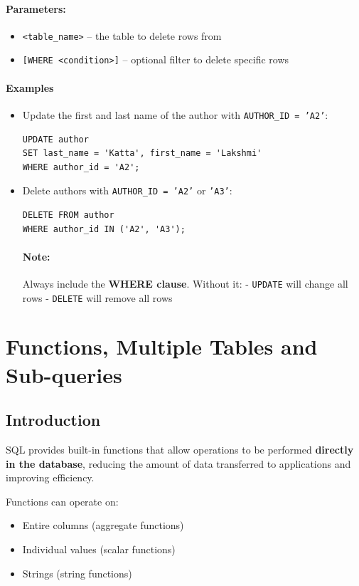 \documentclass{article}
\begin{document}
\paragraph{Parameters:}
\begin{itemize}
    \item \texttt{<table\_name>} – the table to delete rows from  
    \item \texttt{[WHERE <condition>]} – optional filter to delete specific rows
\end{itemize}


\paragraph{Examples}
\begin{itemize}
    \item Update the first and last name of the author with \texttt{AUTHOR\_ID = 'A2'}:  
\begin{verbatim}
UPDATE author
SET last_name = 'Katta', first_name = 'Lakshmi'
WHERE author_id = 'A2';
\end{verbatim}

    \item Delete authors with \texttt{AUTHOR\_ID = 'A2'} or \texttt{'A3'}:  
\begin{verbatim}
DELETE FROM author
WHERE author_id IN ('A2', 'A3');
\end{verbatim}
\paragraph{Note:} Always include the \textbf{WHERE clause}.  
Without it:  
- \texttt{UPDATE} will change all rows  
- \texttt{DELETE} will remove all rows
\end{itemize}

\newpage
\section{Functions, Multiple Tables and Sub-queries}


\subsection{Introduction}
SQL provides built-in functions that allow operations to be performed \textbf{directly in the database}, reducing the amount of data transferred to applications and improving efficiency.  

Functions can operate on:
\begin{itemize}
    \item Entire columns (aggregate functions)
    \item Individual values (scalar functions)
    \item Strings (string functions)
\end{itemize}
\end{document}

